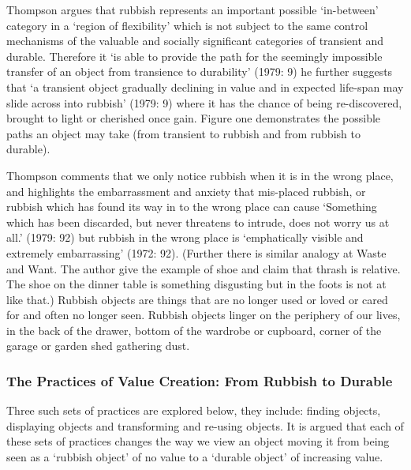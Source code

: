 Thompson argues that rubbish represents an important possible ‘in-between’ category in a ‘region of flexibility’ which is not subject to the same control mechanisms of the valuable and socially significant categories of transient and durable. Therefore it ‘is able to provide the path for the seemingly impossible transfer of an object from transience to durability’ (1979: 9) he further suggests that ‘a transient object gradually declining in value and in expected life-span may slide across into rubbish’ (1979: 9) where it has the chance of being re-discovered, brought to light or cherished once gain. Figure one demonstrates the possible paths an object may take (from transient to rubbish and from rubbish to durable). 

Thompson comments that we only notice rubbish when it is in the wrong place, and highlights the embarrassment and anxiety that mis-placed rubbish, or rubbish which has found its way in to the wrong place can cause ‘Something which has been discarded, but never threatens to intrude, does not worry us at all.’ (1979: 92) but rubbish in the wrong place is ‘emphatically visible and extremely embarrassing’ (1972: 92). (Further there is similar analogy at Waste and Want. The author give the example of shoe and claim that thrash is relative. The shoe on the dinner table is something disgusting but in the foots is not at like that.) Rubbish objects are things that are no longer used or loved or cared for and often no longer seen. Rubbish objects linger on the periphery of our lives, in the back of the drawer, bottom of the wardrobe or cupboard, corner of the garage or garden shed gathering dust.


\subsubsection{The Practices of Value Creation: From Rubbish to Durable}
Three such sets of practices are explored below, they include: finding objects, displaying objects and transforming and re-using objects. It is argued that each of these sets of practices changes the way we view an object moving it from being seen as a ‘rubbish object’ of no value to a ‘durable object’ of increasing value.

